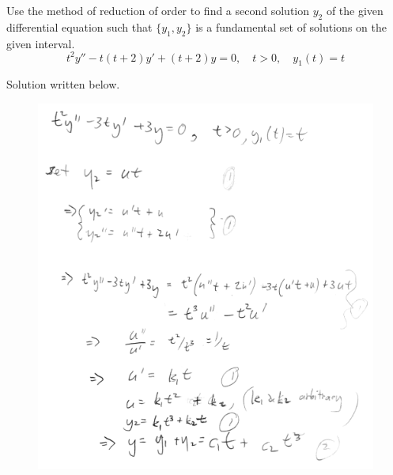 \ifnum {}
\question[7] Use the method of reduction of order to find a second solution $y_2$ of the given differential equation such that $\{y_1, y_2\}$ is a fundamental set of solutions on the given interval. $$t^2y'' - t(t+2)y' + (t+2)y=0, \quad t > 0 , \quad y_1(t) = t$$
\ifnum {} {\color{DarkBlue} Solution written below. 
    \begin{figure}[h]
    \centering
    \includegraphics[width=14cm]{Images/ImgTest2RoO.png}
    \end{figure}  
} 
\else 
\vspace{3cm}
\fi
\fi 

